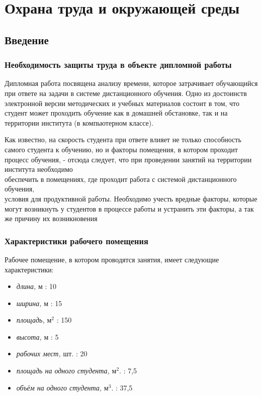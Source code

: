  \chapter{Охрана труда и окружающей среды}
\label{mainpart}  
\section{Введение}

\subsection{Необходимость защиты труда в объекте дипломной работы}

Дипломная работа посвящена анализу времени, которое затрачивает обучающийся при ответе на задачи в системе дистанционного обучения. Одно из достоинств электронной версии методических и учебных материалов состоит в том, что студент может проходить обучение как в домашней обстановке, так и на территории института (в компьютерном классе). 

Как известно, на скорость студента при ответе влияет не только способность самого студента к обучению, но и факторы помещения, в котором проходит процесс обучения, - отсюда следует, что при проведении занятий на территории института необходимо \\ обеспечить в помещениях, где проходит работа с системой дистанционного обучения,\\ условия для продуктивной работы. Необходимо учесть вредные факторы, которые могут возникнуть у студентов в процессе работы и устранить эти факторы, а так же причину их возникновения

\subsection{Характеристики рабочего помещения}
\label{hro}

Рабочее помещение, в котором проводятся занятия, имеет следующие характеристики:

\begin{itemize}
\item {\itshape длина,} м : 10
\item {\itshape ширина,} м : 15
\item {\itshape площадь,} м$^2$ : 150
\item {\itshape высота,} м : 5
\item {\itshape рабочих мест,} шт. : 20
\item {\itshape площадь на одного студента,} м$^2$. : 7,5
\item {\itshape объём на одного студента,} м$^3$. : 37,5
\end{itemize}

